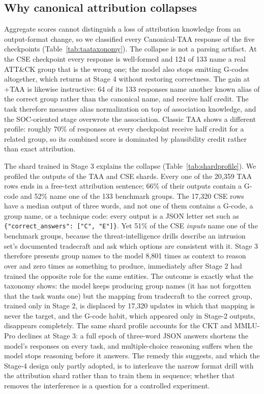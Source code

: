\documentclass[twocolumn]{svjour3}
\begin{document}
\subsection{Why canonical attribution collapses}\label{sec:cseshard}
Aggregate scores cannot distinguish a loss of attribution knowledge from an output-format change, so we classified every Canonical-TAA response of the five checkpoints (Table~\ref{tab:taataxonomy}). The collapse is not a parsing artifact. At the CSE checkpoint every response is well-formed and 124 of 133 name a real ATT\&CK group that is the wrong one; the model also stops emitting G-codes altogether, which returns at Stage 4 without restoring correctness. The gain at +TAA is likewise instructive: 64 of its 133 responses name another known alias of the correct group rather than the canonical name, and receive half credit. The task therefore measures alias normalization on top of association knowledge, and the SOC-oriented stage overwrote the association. Classic TAA shows a different profile: roughly 70\% of responses at every checkpoint receive half credit for a related group, so its combined score is dominated by plausibility credit rather than exact attribution.

The shard trained in Stage 3 explains the collapse (Table~\ref{tab:shardprofile}). We profiled the outputs of the TAA and CSE shards. Every one of the 20,359 TAA rows ends in a free-text attribution sentence; 66\% of their outputs contain a G-code and 52\% name one of the 133 benchmark groups. The 17,320 CSE rows have a median output of three words, and not one of them contains a G-code, a group name, or a technique code: every output is a JSON letter set such as \texttt{\{"correct\_answers": ["C", "E"]\}}. Yet 51\% of the CSE \emph{inputs} name one of the benchmark groups, because the threat-intelligence drills describe an intrusion set's documented tradecraft and ask which options are consistent with it. Stage 3 therefore presents group names to the model 8,801 times as context to reason over and zero times as something to produce, immediately after Stage 2 had trained the opposite role for the same entities. The outcome is exactly what the taxonomy shows: the model keeps producing group names (it has not forgotten that the task wants one) but the mapping from tradecraft to the correct group, trained only in Stage 2, is displaced by 17,320 updates in which that mapping is never the target, and the G-code habit, which appeared only in Stage-2 outputs, disappears completely. The same shard profile accounts for the CKT and MMLU-Pro declines at Stage 3: a full epoch of three-word JSON answers shortens the model's responses on every task, and multiple-choice reasoning suffers when the model stops reasoning before it answers. The remedy this suggests, and which the Stage-4 design only partly adopted, is to interleave the narrow format drill with the attribution shard rather than to train them in sequence; whether that removes the interference is a question for a controlled experiment.
\end{document}
